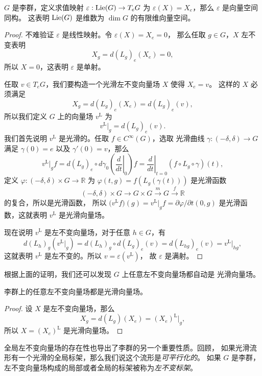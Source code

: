 \begin{theorem}\label{thm:dim of lie algebra}
  $G$ 是李群，定义求值映射 $\varepsilon:\operatorname{Lie}(G)\to T_eG$ 为
  $\varepsilon(X)=X_e$，那么 $\varepsilon$ 是向量空间同构。
  这表明 $\operatorname{Lie}(G)$ 是维数为 $\dim G$ 的有限维向量空间。
\end{theorem}
\begin{proof}
  不难验证 $\varepsilon$ 是线性映射。令 $\varepsilon(X)=X_e=0$，
  那么任取 $g\in G$，$X$ 左不变表明
  \[
    X_g=d(L_g)_e(X_e)=0,
  \]
  所以 $X=0$，这表明 $\varepsilon$ 是单射。

  任取 $v\in T_eG$，我们要构造一个光滑左不变向量场 $X$ 使得 $X_e=v$。
  这样的 $X$ 必须满足 
  \[
    X_g=d(L_g)_e(X_e)=d(L_g)_e(v),  
  \]
  所以我们定义 $G$ 上的向量场 $v^{\mathrm{L}}$ 为
  \[
    v^{\mathrm{L}}\big|_g=d(L_g)_e(v).
  \]
  我们首先说明 $v^{\mathrm{L}}$ 是光滑的。任取 $f\in C^\infty(G)$，选取
  光滑曲线 $\gamma:(-\delta,\delta)\to G$ 满足 $\gamma(0)=e$ 以及
  $\gamma'(0)=v$，那么
  \[
    v^{\mathrm{L}}\big|_gf=d(L_g)_e\circ d\gamma_0\left(\left.\frac{d}{dt}\right|_0\right)f
    =\left.\frac{d}{dt}\right|_{t=0}(f\circ L_g\circ\gamma)(t),
  \]
  定义 $\varphi:(-\delta,\delta)\times G\to \mathbb{R}$ 为
  $\varphi(t,g)=f(L_g(\gamma(t)))$ 是光滑函数
  \[
    (-\delta,\delta)\times G\to G\times G\xrightarrow{m} G\xrightarrow{f} \mathbb{R}
  \]
  的复合，所以是光滑函数，
  所以 $\bigl(v^{\mathrm{L}}f\bigr)(g)=v^{\mathrm{L}}\big|_gf=\partial\varphi/\partial t(0,g)$ 
  是光滑函数，这就表明 $v^{\mathrm{L}}$ 是光滑向量场。

  现在说明 $v^{\mathrm{L}}$ 是左不变向量场，对于任意 $h\in G$，有
  \[
      d(L_h)_{g}\left(v^{\mathrm{L}}\big|_g\right)
      =d(L_h)_g\circ d(L_g)_e(v)=d(L_{hg})_e(v)=
      v^{\mathrm{L}}\big|_{hg},
  \]
  这就表明 $v^{\mathrm{L}}$ 是左不变的。所以 $v=\varepsilon(v^{\mathrm{L}})$，
  故 $\varepsilon$ 是满射。
\end{proof}

根据上面的证明，我们还可以发现 $G$ 上任意左不变向量场都自动是
光滑向量场。

\begin{corollary}
  李群上的任意左不变向量场都是光滑向量场。
\end{corollary}
\begin{proof}
  设 $X$ 是左不变向量场，那么
  \[
    X_g=d(L_g)(X_e)=(X_e)^{\mathrm{L}}\big|_g,
  \]
  所以 $X=(X_e)^{\mathrm{L}}$ 是光滑向量场。
\end{proof}

全局左不变向量场的存在性也导出了李群的另一个重要性质。回顾，
如果光滑流形有一个光滑的全局标架，那么我们说这个流形是\emph{可平行化的}。
如果 $G$ 是李群，左不变向量场构成的局部或者全局的标架被称为\emph{左不变标架}。


